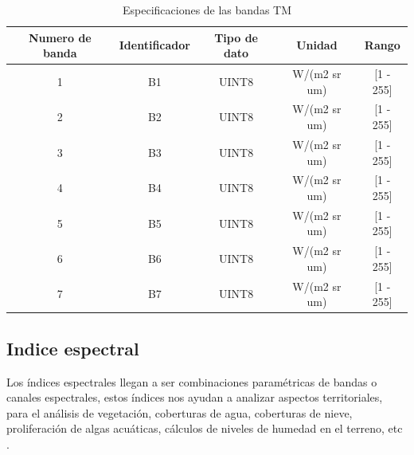 	\begin{table}[h!]
		\centering
		\begin{tabular}{|c|c|c|c|c|}
			\hline
			\textbf{Numero de banda} & \textbf{Identificador} &\textbf{Tipo de dato} & \textbf{Unidad} & \textbf{Rango}\\
			\hline
			1  & B1 & UINT8 &W/(m2 sr um)& [1 - 255]\\
			2 & B2 & UINT8&W/(m2 sr um)& [1 - 255]\\
			3 & B3 & UINT8&W/(m2 sr um)& [1 - 255] \\
			4 & B4 & UINT8&W/(m2 sr um)& [1 - 255] \\
			5 & B5 & UINT8&W/(m2 sr um)& [1 - 255] \\
			6 & B6 & UINT8&W/(m2 sr um)& [1 - 255] \\
			7 & B7 & UINT8 &W/(m2 sr um)& [1 - 255] \\
			\hline
		\end{tabular}
		\caption{Especificaciones de las bandas TM}
		\label{tabla2.5}
	\end{table}
	
	\subsection{Indice espectral}
	Los índices espectrales llegan a ser combinaciones paramétricas de bandas o canales espectrales, estos índices nos ayudan a analizar aspectos territoriales, para el análisis de vegetación, coberturas de agua, coberturas de nieve, proliferación de algas acuáticas, cálculos de niveles de humedad en el terreno, etc \parencite{eos}.
	
